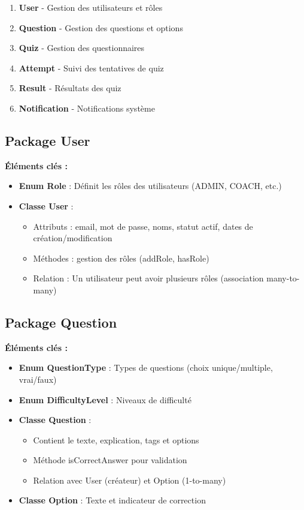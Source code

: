 \documentclass[12pt,a4paper]{report}
\begin{document}
\begin{enumerate}
\item \textbf{User} - Gestion des utilisateurs et rôles
\item \textbf{Question} - Gestion des questions et options
\item \textbf{Quiz} - Gestion des questionnaires
\item \textbf{Attempt} - Suivi des tentatives de quiz
\item \textbf{Result} - Résultats des quiz
\item \textbf{Notification} - Notifications système
\end{enumerate}

\subsection{Package User}

\textbf{Éléments clés :}
\begin{itemize}
\item \textbf{Enum Role} : Définit les rôles des utilisateurs (ADMIN, COACH, etc.)
\item \textbf{Classe User} :
  \begin{itemize}
  \item Attributs : email, mot de passe, noms, statut actif, dates de création/modification
  \item Méthodes : gestion des rôles (addRole, hasRole)
  \item Relation : Un utilisateur peut avoir plusieurs rôles (association many-to-many)
  \end{itemize}
\end{itemize}

\subsection{Package Question}

\textbf{Éléments clés :}
\begin{itemize}
\item \textbf{Enum QuestionType} : Types de questions (choix unique/multiple, vrai/faux)
\item \textbf{Enum DifficultyLevel} : Niveaux de difficulté
\item \textbf{Classe Question} :
  \begin{itemize}
  \item Contient le texte, explication, tags et options
  \item Méthode isCorrectAnswer pour validation
  \item Relation avec User (créateur) et Option (1-to-many)
  \end{itemize}
\item \textbf{Classe Option} : Texte et indicateur de correction
\end{itemize}
\end{document}
